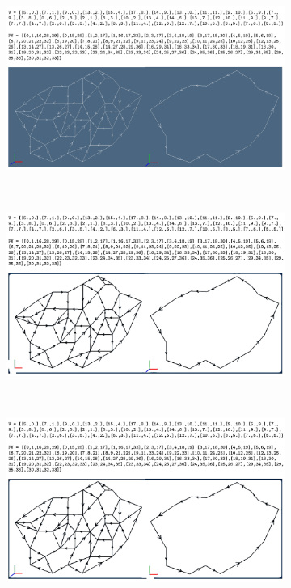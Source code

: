 \begin{figure}[!h]
 \centering
 \begin{subfigure}[b]{\linewidth}
 \includegraphics[width=\textwidth]{images/minimum-data}
 \end{subfigure}
\\
 \begin{subfigure}[b]{0.48\linewidth}
 \includegraphics[width=\textwidth]{images/minimum-colors-a}
 \caption{}
 \vspace*{4mm}
 \end{subfigure}
 ~
 \begin{subfigure}[b]{0.48\linewidth}
 \includegraphics[width=\textwidth]{images/minimum-colors-b}

\end{subfigure}
\end{figure}
